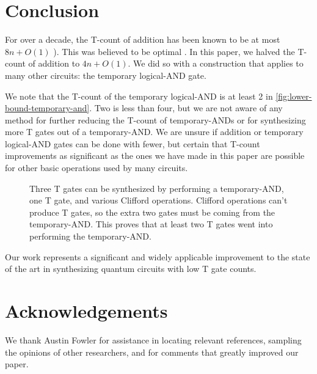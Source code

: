 \documentclass[twocolumn,longbibliography]{quantumarticle-customized}
\newcommand{\qT}{\gate{T}}
\newcommand{\qS}{\gate{S}}
\begin{document}
\section{Conclusion}
\label{sec:conclusion}

For over a decade, the T-count of addition has been known to be at most $8n + O(1)$ \cite{Amy2013, Barenco1995, Cuccaro2004}).
This was believed to be optimal \cite{AustinDiscussionsAndEmails2017}.
In this paper, we halved the T-count of addition to $4n + O(1)$.
We did so with a construction that applies to many other circuits: the temporary logical-AND gate.

We note that the T-count of the temporary logical-AND is at least 2 in \autoref{fig:lower-bound-temporary-and}.
Two is less than four, but we are not aware of any method for further reducing the T-count of temporary-ANDs or for synthesizing more T gates out of a temporary-AND.
We are unsure if addition or temporary logical-AND gates can be done with fewer, but certain that T-count improvements as significant as the ones we have made in this paper are possible for other basic operations used by many circuits.

\begin{figure}
  \resizebox{\linewidth}{!}{
    \Qcircuit @R=0.7em @C=0.7em {
      &\qT &\qw && &&&\ctrl{2}&\qw     &\ctrl{3}&\qw     &\qw &\qw     &\ctrl{3}&\qw     &\ctrl{2}&\qw &\\
      &\qT &\qw &&=&&&\targ   &\ctrl{1}&\qw     &\ctrl{1}&\qw &\ctrl{1}&\qw     &\ctrl{1}&\targ   &\qw &\\
      &\qT &\qw && &&&\targ   &\ctrl{1}&\targ   &\targ   &\qT &\targ   &\targ   &\ctrl{1}&\targ   &\qw &\\
      &    &    && &&&        &        &\targ   &\qw     &\qS &\qw     &\targ   &\qw     &        &    &\\
    }
  }
  \caption{
	Three T gates can be synthesized by performing a temporary-AND, one T gate, and various Clifford operations.
	Clifford operations can't produce T gates, so the extra two gates must be coming from the temporary-AND.
	This proves that at least two T gates went into performing the temporary-AND.
  }
  \label{fig:lower-bound-temporary-and}
\end{figure}

Our work represents a significant and widely applicable improvement to the state of the art in synthesizing quantum circuits with low T gate counts.


\section{Acknowledgements}

We thank Austin Fowler for assistance in locating relevant references, sampling the opinions of other researchers, and for comments that greatly improved our paper.




\end{document}
